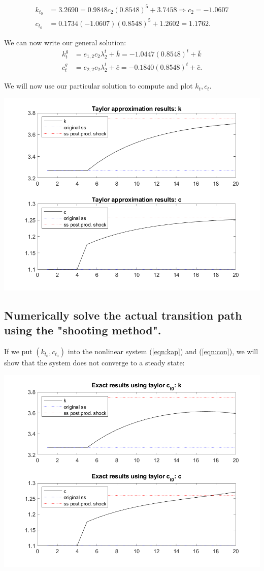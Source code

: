 \documentclass[11pt]{article} %
\begin{document}
\begin{align*}
k_{t_0} &= 3.2690 = 0.9848 c_2 (0.8548)^{5} + 3.7458 \Rightarrow c_2 = -1.0607 \\
c_{t_0} &= 0.1734 (-1.0607) (0.8548)^{5} + 1.2602 = 1.1762.
\end{align*}

We can now write our general solution:
\begin{align*}
k_{t}^{g} &= e_{1,2} c_2 \lambda_{2}^{t} + \bar{k}  = -1.0447 (0.8548)^t + \bar{k}\\
c_{t}^{g} &= e_{2,2} c_2 \lambda_{2}^{t} + \bar{c}  = -0.1840 (0.8548)^t + \bar{c}.
\end{align*}

We will now use our particular solution to compute and plot $k_t,c_t$.

\includegraphics{taylor}

\subsection{Numerically solve the actual transition path using the "shooting method".}

If we put $(k_{t_0},c_{t_0})$ into the nonlinear system  (\ref{eqn:kap}) and (\ref{eqn:con}), we will show that the system does not converge to a steady state:

\includegraphics{exact}
\end{document}
